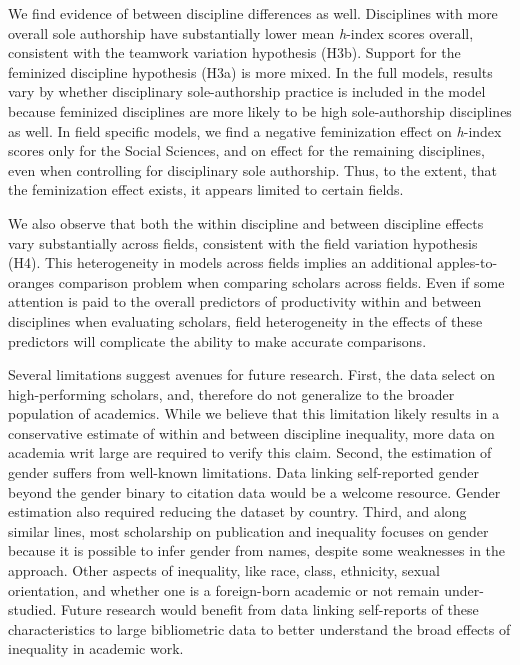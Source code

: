 \documentclass[
  10pt,
  letterpaper,
]{article}
\begin{document}
We find evidence of between discipline differences as well. Disciplines
with more overall sole authorship have substantially lower mean
\emph{h}-index scores overall, consistent with the teamwork variation
hypothesis (H3b). Support for the feminized discipline hypothesis (H3a)
is more mixed. In the full models, results vary by whether disciplinary
sole-authorship practice is included in the model because feminized
disciplines are more likely to be high sole-authorship disciplines as
well. In field specific models, we find a negative feminization effect
on \emph{h}-index scores only for the Social Sciences, and on effect for
the remaining disciplines, even when controlling for disciplinary sole
authorship. Thus, to the extent, that the feminization effect exists, it
appears limited to certain fields.

We also observe that both the within discipline and between discipline
effects vary substantially across fields, consistent with the field
variation hypothesis (H4). This heterogeneity in models across fields
implies an additional apples-to-oranges comparison problem when
comparing scholars across fields. Even if some attention is paid to the
overall predictors of productivity within and between disciplines when
evaluating scholars, field heterogeneity in the effects of these
predictors will complicate the ability to make accurate comparisons.

Several limitations suggest avenues for future research. First, the data
select on high-performing scholars, and, therefore do not generalize to
the broader population of academics. While we believe that this
limitation likely results in a conservative estimate of within and
between discipline inequality, more data on academia writ large are
required to verify this claim. Second, the estimation of gender suffers
from well-known limitations. Data linking self-reported gender beyond
the gender binary to citation data would be a welcome resource. Gender
estimation also required reducing the dataset by country. Third, and
along similar lines, most scholarship on publication and inequality
focuses on gender because it is possible to infer gender from names,
despite some weaknesses in the approach. Other aspects of inequality,
like race, class, ethnicity, sexual orientation, and whether one is a
foreign-born academic or not remain under-studied. Future research would
benefit from data linking self-reports of these characteristics to large
bibliometric data to better understand the broad effects of inequality
in academic work.
\end{document}
